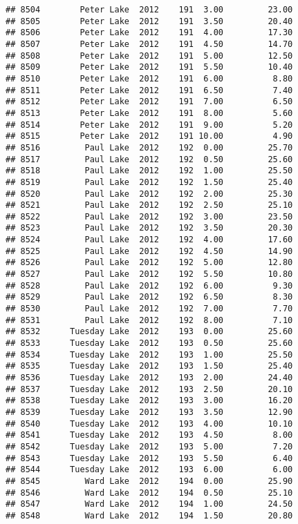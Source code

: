 \documentclass[
]{article}
\begin{document}
\begin{verbatim}
## 8504        Peter Lake  2012    191  3.00         23.00
## 8505        Peter Lake  2012    191  3.50         20.40
## 8506        Peter Lake  2012    191  4.00         17.30
## 8507        Peter Lake  2012    191  4.50         14.70
## 8508        Peter Lake  2012    191  5.00         12.50
## 8509        Peter Lake  2012    191  5.50         10.40
## 8510        Peter Lake  2012    191  6.00          8.80
## 8511        Peter Lake  2012    191  6.50          7.40
## 8512        Peter Lake  2012    191  7.00          6.50
## 8513        Peter Lake  2012    191  8.00          5.60
## 8514        Peter Lake  2012    191  9.00          5.20
## 8515        Peter Lake  2012    191 10.00          4.90
## 8516         Paul Lake  2012    192  0.00         25.70
## 8517         Paul Lake  2012    192  0.50         25.60
## 8518         Paul Lake  2012    192  1.00         25.50
## 8519         Paul Lake  2012    192  1.50         25.40
## 8520         Paul Lake  2012    192  2.00         25.30
## 8521         Paul Lake  2012    192  2.50         25.10
## 8522         Paul Lake  2012    192  3.00         23.50
## 8523         Paul Lake  2012    192  3.50         20.30
## 8524         Paul Lake  2012    192  4.00         17.60
## 8525         Paul Lake  2012    192  4.50         14.90
## 8526         Paul Lake  2012    192  5.00         12.80
## 8527         Paul Lake  2012    192  5.50         10.80
## 8528         Paul Lake  2012    192  6.00          9.30
## 8529         Paul Lake  2012    192  6.50          8.30
## 8530         Paul Lake  2012    192  7.00          7.70
## 8531         Paul Lake  2012    192  8.00          7.10
## 8532      Tuesday Lake  2012    193  0.00         25.60
## 8533      Tuesday Lake  2012    193  0.50         25.60
## 8534      Tuesday Lake  2012    193  1.00         25.50
## 8535      Tuesday Lake  2012    193  1.50         25.40
## 8536      Tuesday Lake  2012    193  2.00         24.40
## 8537      Tuesday Lake  2012    193  2.50         20.10
## 8538      Tuesday Lake  2012    193  3.00         16.20
## 8539      Tuesday Lake  2012    193  3.50         12.90
## 8540      Tuesday Lake  2012    193  4.00         10.10
## 8541      Tuesday Lake  2012    193  4.50          8.00
## 8542      Tuesday Lake  2012    193  5.00          7.20
## 8543      Tuesday Lake  2012    193  5.50          6.40
## 8544      Tuesday Lake  2012    193  6.00          6.00
## 8545         Ward Lake  2012    194  0.00         25.90
## 8546         Ward Lake  2012    194  0.50         25.10
## 8547         Ward Lake  2012    194  1.00         24.50
## 8548         Ward Lake  2012    194  1.50         20.80

\end{verbatim}
\end{document}
